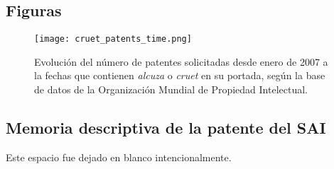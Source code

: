 \subsection{Figuras}

\begin{figure}[hb]
  \texttt{[image: cruet\_patents\_time.png]}
  \label{alcuzas_tiempo}
  \caption{Evolución del número de patentes solicitadas desde enero de 2007 a la fechas que contienen \textit{alcuza} o \textit{cruet} en su portada, según la base de datos de la Organización Mundial de Propiedad Intelectual.}
\end{figure}

\newpage

\subsection{Memoria descriptiva de la patente del SAI}
\vspace{7cm}
\centering
Este espacio fue dejado en blanco intencionalmente.


% 
